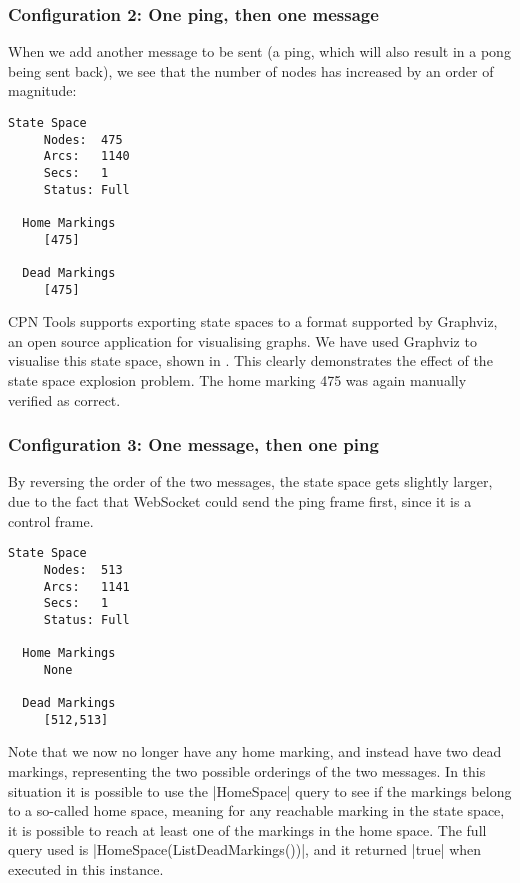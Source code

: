 	\subsubsection{Configuration 2: One ping, then one message}
	When we add another message to be sent (a ping, which will also result in a
	pong being sent back), we see that the number of nodes has increased by an
	order of magnitude:
	
	\begin{lstlisting}[language={},float,caption=One ping then one message]
  State Space
     Nodes:  475
     Arcs:   1140
     Secs:   1
     Status: Full
     
  Home Markings
     [475]

  Dead Markings
     [475]
	\end{lstlisting}
	
	CPN Tools supports exporting state spaces to a format supported by Graphviz, an
	open source application for visualising graphs. We have used Graphviz to
	visualise this state space, shown in . This
	clearly demonstrates the effect of the state space explosion problem. 
		The home marking 475 was again manually verified as correct.
	

	\subsubsection{Configuration 3: One message, then one ping}
	By reversing the order of the two messages, the state space gets slightly
	larger, due to the fact that WebSocket could send the ping frame first, since
	it is a control frame.
	
	\begin{lstlisting}[language={},float]
  State Space
     Nodes:  513
     Arcs:   1141
     Secs:   1
     Status: Full
     
  Home Markings
     None

  Dead Markings
     [512,513]
	\end{lstlisting}
	Note that we now no longer have any home marking, and instead have two dead
	markings, representing the two possible orderings of the two messages. In this
	situation it is possible to use the |HomeSpace| query to see if the markings
	belong to a so-called home space, meaning for any reachable marking in the
	state space, it is possible to reach at least one of the markings in the home
	space. The full query used is |HomeSpace(ListDeadMarkings())|, and it returned
	|true| when executed in this instance.
	
